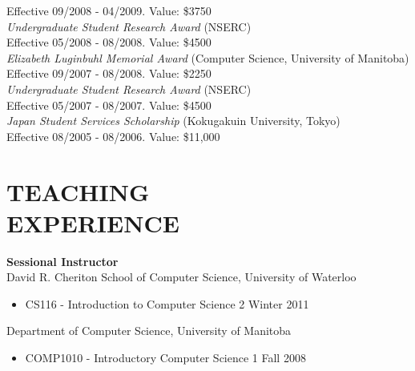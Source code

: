 \documentclass[line,margin]{res}
\begin{document}
\begin{resume}
  \hspace*{1cm} Effective 09/2008 - 04/2009. Value: \$3750 \vspace{3pt} \\
  {\sl Undergraduate Student Research Award} (NSERC) \\
  \hspace*{1cm} Effective 05/2008 - 08/2008. Value: \$4500 \vspace{3pt} \\
  {\sl Elizabeth Luginbuhl Memorial Award} (Computer Science, University of Manitoba) \\
  \hspace*{1cm} Effective 09/2007 - 08/2008. Value: \$2250 \vspace{3pt} \\
  {\sl Undergraduate Student Research Award} (NSERC) \\
  \hspace*{1cm} Effective 05/2007 - 08/2007. Value: \$4500 \vspace{3pt} \\
  {\sl Japan Student Services Scholarship} (Kokugakuin University, Tokyo) \\
  \hspace*{1cm} Effective 08/2005 - 08/2006. Value: \$11,000

\clearpage

\section{TEACHING \\EXPERIENCE}
  {\bf Sessional Instructor} \vspace{4pt} \\
  David R. Cheriton School of Computer Science, University of Waterloo
  \begin{itemize}  \itemsep -2pt %
    \item CS116 - Introduction to Computer Science 2 \hfill Winter 2011
  \end{itemize} \vspace{-8pt}
  Department of Computer Science, University of Manitoba
  \begin{itemize}  \itemsep -2pt %
    \item COMP1010 - Introductory Computer Science 1 \hfill Fall 2008
  \end{itemize}
  

\end{resume}
\end{document}
